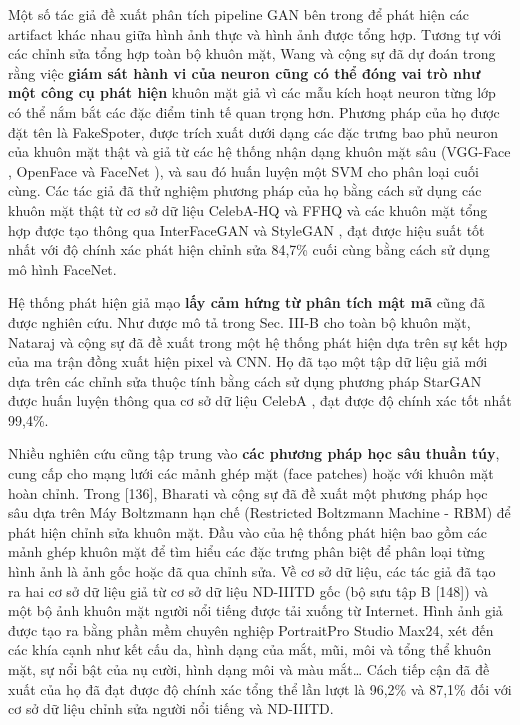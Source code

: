 \documentclass{article}
\begin{document}
Một số tác giả đề xuất phân tích pipeline GAN bên trong để phát hiện các artifact khác nhau giữa hình ảnh thực và hình ảnh được tổng hợp. Tương tự với các chỉnh sửa tổng hợp toàn bộ khuôn mặt, Wang và cộng sự đã dự đoán trong  rằng việc \textbf{giám sát hành vi của neuron cũng có thể đóng vai trò như một công cụ phát hiện} khuôn mặt giả vì các mẫu kích hoạt neuron từng lớp có thể nắm bắt các đặc điểm tinh tế quan trọng hơn. Phương pháp của họ được đặt tên là FakeSpoter, được trích xuất dưới dạng các đặc trưng bao phủ neuron của khuôn mặt thật và giả từ các hệ thống nhận dạng khuôn mặt sâu (VGG-Face , OpenFace  và FaceNet ), và sau đó huấn luyện một SVM cho phân loại cuối cùng. Các tác giả đã thử nghiệm phương pháp của họ bằng cách sử dụng các khuôn mặt thật từ cơ sở dữ liệu CelebA-HQ  và FFHQ  và các khuôn mặt tổng hợp được tạo thông qua InterFaceGAN  và StyleGAN , đạt được hiệu suất tốt nhất với độ chính xác phát hiện chỉnh sửa 84,7\% cuối cùng bằng cách sử dụng mô hình FaceNet.

Hệ thống phát hiện giả mạo \textbf{lấy cảm hứng từ phân tích mật mã} cũng đã được nghiên cứu. Như được mô tả trong Sec. III-B cho toàn bộ khuôn mặt, Nataraj và cộng sự đã đề xuất trong  một hệ thống phát hiện dựa trên sự kết hợp của ma trận đồng xuất hiện pixel và CNN. Họ đã tạo một tập dữ liệu giả mới dựa trên các chỉnh sửa thuộc tính bằng cách sử dụng phương pháp StarGAN  được huấn luyện thông qua cơ sở dữ liệu CelebA , đạt được độ chính xác tốt nhất 99,4\%.

Nhiều nghiên cứu cũng tập trung vào \textbf{các phương pháp học sâu thuần túy}, cung cấp cho mạng lưới các mảnh ghép mặt (face patches) hoặc với khuôn mặt hoàn chỉnh. Trong [136], Bharati và cộng sự đã đề xuất một phương pháp học sâu dựa trên Máy Boltzmann hạn chế (Restricted Boltzmann Machine - RBM) để phát hiện chỉnh sửa khuôn mặt. Đầu vào của hệ thống phát hiện bao gồm các mảnh ghép khuôn mặt để tìm hiểu các đặc trưng phân biệt để phân loại từng hình ảnh là ảnh gốc hoặc đã qua chỉnh sửa. Về cơ sở dữ liệu, các tác giả đã tạo ra hai cơ sở dữ liệu giả từ cơ sở dữ liệu ND-IIITD gốc (bộ sưu tập B [148]) và một bộ ảnh khuôn mặt người nổi tiếng được tải xuống từ Internet. Hình ảnh giả được tạo ra bằng phần mềm chuyên nghiệp PortraitPro Studio Max24, xét đến các khía cạnh như kết cấu da, hình dạng của mắt, mũi, môi và tổng thể khuôn mặt, sự nổi bật của nụ cười, hình dạng môi và màu mắt… Cách tiếp cận đã đề xuất của họ đã đạt được độ chính xác tổng thể lần lượt là 96,2\% và 87,1\% đối với cơ sở dữ liệu chỉnh sửa người nổi tiếng và ND-IIITD.
\end{document}
